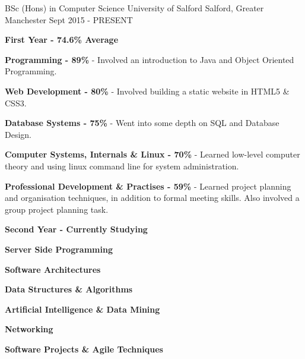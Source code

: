 

\begin{cventries}

  \cventry
    {BSc (Hons) in Computer Science} %
    {University of Salford} %
    {Salford, Greater Manchester} %
    {Sept 2015 - PRESENT} %
    {
      \begin{cvitems} %
        \item {\textbf{First Year - 74.6\% Average}} 
        \item {\textbf{Programming - 89\%} - Involved an introduction to Java and Object Oriented Programming.}
        \item {\textbf{Web Development - 80\%} - Involved building a static website in HTML5 \& CSS3.}
        \item {\textbf{Database Systems - 75\%} - Went into some depth on SQL and Database Design.}
        \item {\textbf{Computer Systems, Internals \& Linux - 70\%} - Learned low-level computer theory and using linux command line for system administration.}
        \item {\textbf{Professional Development \& Practises - 59\%} - Learned project planning and organisation techniques, in addition to formal meeting skills. Also involved a group project planning task.}
        \item {\textbf{Second Year - Currently Studying}} 
        \item {\textbf{Server Side Programming}}
        \item {\textbf{Software Architectures}}
        \item {\textbf{Data Structures \& Algorithms}}
        \item {\textbf{Artificial Intelligence \& Data Mining}}
        \item {\textbf{Networking}}
        \item {\textbf{Software Projects \& Agile Techniques}}
      \end{cvitems}
    }

\end{cventries}
